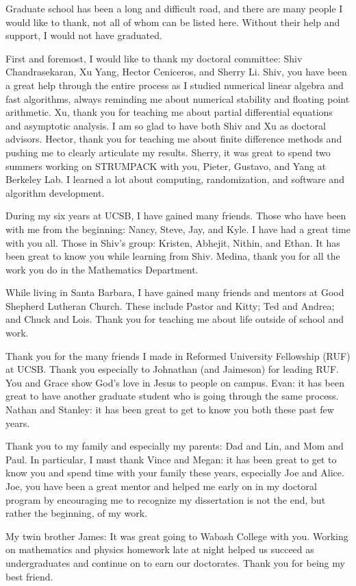 Graduate school has been a long and difficult road,
and there are many people I would like to thank, not all of whom
can be listed here.
Without their help and support, I would not have graduated.

First and foremost, I would like to thank my doctoral committee:
Shiv Chandrasekaran, Xu Yang, Hector Ceniceros, and Sherry Li.
Shiv, you have been a great help through the entire process
as I studied numerical linear algebra and fast algorithms,
always reminding me about numerical stability and floating point arithmetic.
Xu, thank you for teaching me about partial differential equations
and asymptotic analysis.
I am so glad to have both Shiv and Xu as doctoral advisors.
Hector, thank you for teaching me about finite difference methods
and pushing me to clearly articulate my results.
Sherry, it was great to spend two summers working on STRUMPACK with you,
Pieter, Gustavo, and Yang at Berkeley Lab.
I learned a lot about computing, randomization,
and software and algorithm development.

During my six years at UCSB, I have gained many friends.
Those who have been with me from the beginning: Nancy, Steve, Jay, and Kyle.
I have had a great time with you all.
Those in Shiv's group: Kristen, Abhejit, Nithin, and Ethan.
It has been great to know you while learning from Shiv.
Medina, thank you for all the work you do in the Mathematics Department.

While living in Santa Barbara, I have gained many friends
and mentors at Good Shepherd Lutheran Church.
These include Pastor and Kitty; Ted and Andrea; and Chuck and Lois.
Thank you for teaching me about life outside of school and work.

Thank you for the many friends I made in Reformed University Fellowship
(RUF) at UCSB.
Thank you especially to Johnathan (and Jaimeson) for leading RUF.
You and Grace show God's love in Jesus to people on campus.
Evan: it has been great to have another graduate student who is
going through the same process.
Nathan and Stanley: it has been great to get to know you both these past
few years.

Thank you to my family and especially my parents:
Dad and Lin, and Mom and Paul.
In particular, I must thank Vince and Megan:
it has been great to get to know you and spend
time with your family these years, especially Joe and Alice.
Joe, you have been a great mentor and helped me early on
in my doctoral program by encouraging me to recognize
my dissertation is not the end, but rather the beginning, of my work.

My twin brother James: It was great going to Wabash College with
you. Working on mathematics and physics homework late at night
helped us succeed as undergraduates and continue on to earn our doctorates.
Thank you for being my best friend.
